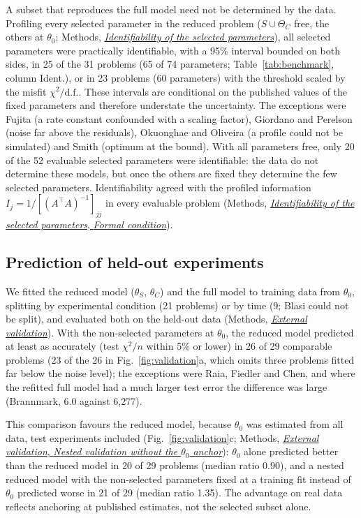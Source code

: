 \documentclass[pdflatex,sn-nature]{sn-jnl}
\theoremstyle{plain}
\newcommand{\mref}[2]{\hyperref[#1]{#2}}
\begin{document}
A subset that reproduces the full model need not be determined by the data. Profiling every selected parameter in the reduced problem ($S\cup\Theta_C$ free, the others at $\theta_0$; Methods, \mref{met:identif}{\emph{Identifiability of the selected parameters}}), all selected parameters were practically identifiable, with a 95\% interval bounded on both sides, in 25 of the 31 problems (65 of 74 parameters; Table~\ref{tab:benchmark}, column Ident.), or in 23 problems (60 parameters) with the threshold scaled by the misfit $\chi^2/\mathrm{d.f.}$. These intervals are conditional on the published values of the fixed parameters and therefore understate the uncertainty. The exceptions were Fujita (a rate constant confounded with a scaling factor), Giordano and Perelson (noise far above the residuals), Okuonghae and Oliveira (a profile could not be simulated) and Smith (optimum at the bound). With all parameters free, only 20 of the 52 evaluable selected parameters were identifiable: the data do not determine these models, but once the others are fixed they determine the few selected parameters. Identifiability agreed with the profiled information $I_j=1/[(A^{\top}A)^{-1}]_{jj}$ in every evaluable problem (Methods, \mref{met:identif-theorem}{\emph{Identifiability of the selected parameters}, \emph{Formal condition}}).

\subsection*{Prediction of held-out experiments}\label{sec:validation}

We fitted the reduced model ($\theta_S$, $\theta_C$) and the full model to training data from $\theta_0$, splitting by experimental condition (21 problems) or by time (9; Blasi could not be split), and evaluated both on the held-out data (Methods, \mref{met:validation}{\emph{External validation}}). With the non-selected parameters at $\theta_0$, the reduced model predicted at least as accurately (test $\chi^2/n$ within 5\% or lower) in 26 of 29 comparable problems (23 of the 26 in Fig.~\ref{fig:validation}a, which omits three problems fitted far below the noise level); the exceptions were Raia, Fiedler and Chen, and where the refitted full model had a much larger test error the difference was large (Brannmark, 6.0 against 6,277).

This comparison favours the reduced model, because $\theta_0$ was estimated from all data, test experiments included (Fig.~\ref{fig:validation}c; Methods, \mref{met:val-nested}{\emph{External validation}, \emph{Nested validation without the $\theta_0$ anchor}}): $\theta_0$ alone predicted better than the reduced model in 20 of 29 problems (median ratio 0.90), and a nested reduced model with the non-selected parameters fixed at a training fit instead of $\theta_0$ predicted worse in 21 of 29 (median ratio 1.35). The advantage on real data reflects anchoring at published estimates, not the selected subset alone.
\end{document}

